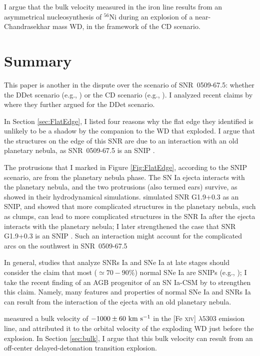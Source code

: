 \documentclass[twocolumn]{aastex701}
\newcommand{\km}{{~\rm km}}
\newcommand{\s}{{~\rm s}}
\begin{document}
I argue that the bulk velocity measured in the iron line results from an asymmetrical nucleosynthesis of $^{56}$Ni during an explosion of a near-Chandrasekhar mass WD, in the framework of the CD scenario.    




\section{Summary}
\label{sec:Summary}

This paper is another in the dispute over the scenario of SNR~0509-67.5: whether the DDet scenario (e.g., \citealt{Dasetal2025, Mandaletal2026}) or the CD scenario (e.g., \citealt{Soker2025SNR0509}). I analyzed recent claims by \cite{Dasetal2026}
where they further argued for the DDet scenario.  
 
In Section \ref{sec:FlatEdge}, I listed four reasons why the flat edge they identified is unlikely to be a shadow by the companion to the WD that exploded. I argue that the structures on the edge of this SNR are due to an interaction with an old planetary nebula, as SNR~0509-67.5 is an SNIP \citep{Soker2025SNR0509}. 

The protrusions that I marked in Figure \ref{Fig:FlatEdge}, according to the SNIP scenario, are from the planetary nebula phase. The SN Ia ejecta interacts with the planetary nebula, and the two protrusions (also termed ears) survive, as \cite{TsebrenkoSoker2013} showed in their hydrodynamical simulations. \cite{TsebrenkoSoker2015} simulated SNR G1.9+0.3 as an SNIP, and showed that more complicated structures in the planetary nebula, such as clumps, can lead to more complicated structures in the SNR Ia after the ejecta interacts with the planetary nebula; I later strengthened the case that SNR G1.9+0.3 is an SNIP \citep{Soker2024RAA}. Such  an interaction might account for the complicated arcs on the southwest in SNR~0509-67.5


In general, studies that analyze SNRs Ia and SNe Ia at late stages should consider the claim that most ($\simeq 70-90\%$) normal SNe Ia are SNIPs (e.g., \citealt{Soker2026SNIPs}); I take the recent finding of an AGB progenitor of an SN Ia-CSM by  \cite{Szalaietal2026} to strengthen this claim. Namely, many features and properties of normal SNe Ia and SNRs Ia can result from the interaction of the ejecta with an old planetary nebula. 

\cite{Dasetal2026} measured a bulk velocity of $-1000 \pm 60 \km \s^{-1}$ in the [Fe \textsc{xiv}] $\lambda5303$ emission line, and attributed it to the orbital velocity of the exploding WD just before the explosion. In Section \ref{sec:bulk}, I argue that this bulk velocity can result from an off-center delayed-detonation transition explosion. 
\end{document}
